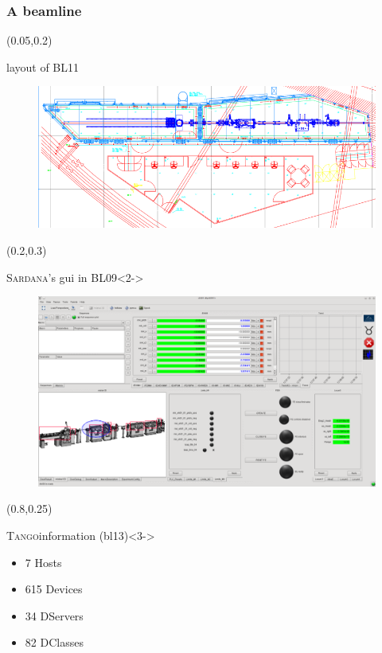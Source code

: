 \documentclass{beamer}
\newcommand{\tango}{\textsc{Tango}}
\newcommand{\sardana}{\textsc{Sardana}}
\begin{document}
\begin{frame}
\frametitle{A beamline}
    \begin{textblock*}{100mm}(0.05\textwidth,0.2\textheight)
        \begin{block}{layout of BL11}
            \begin{figure}
                \includegraphics[width=\textwidth]{imgs/alba/2009_bl11_ncd.png}
            \end{figure}
        \end{block}
    \end{textblock*}
    \begin{textblock*}{100mm}(0.2\textwidth,0.3\textheight)
        \begin{block}{\sardana's gui in BL09}<2->
            \begin{figure}
                \includegraphics[width=\textwidth]{imgs/alba/20130917_ctbl09.png}
            \end{figure}
        \end{block}
    \end{textblock*}
    \begin{textblock*}{35mm}(0.8\textwidth,0.25\textheight)
        \begin{exampleblock}{\tango information (bl13)}<3->
            \begin{itemize}
                \item 7 Hosts
                \item 615 Devices
                \item 34 DServers
                \item 82 DClasses
            \end{itemize}
        \end{exampleblock}
    \end{textblock*}
\end{frame}
\end{document}
